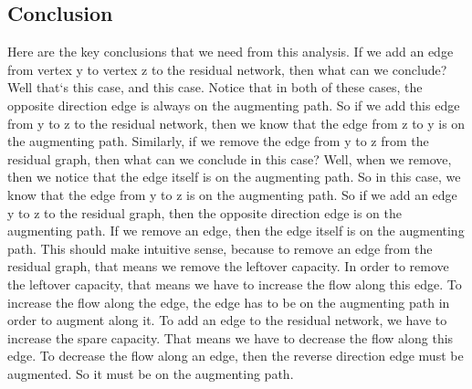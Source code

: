 \subsection{Conclusion}
Here are the key conclusions that we need from this analysis.
If we add an edge from vertex y to vertex z to the residual network, then what can we conclude? Well that`s this case, and this case.
Notice that in both of these cases, the opposite direction edge is always on the augmenting path.
So if we add this edge from y to z to the residual network, then we know that the edge from z to y is on the augmenting path.
Similarly, if we remove the edge from y to z from the residual graph, then what can we conclude in this case? Well, when we remove, then we notice that the edge itself is on the augmenting path.
So in this case, we know that the edge from y to z is on the augmenting path.
So if we add an edge y to z to the residual graph, then the opposite direction edge is on the augmenting path.
If we remove an edge, then the edge itself is on the augmenting path.
This should make intuitive sense, because to remove an edge from the residual graph, that means we remove the leftover capacity.
In order to remove the leftover capacity, that means we have to increase the flow along this edge.
To increase the flow along the edge, the edge has to be on the augmenting path in order to augment along it.
To add an edge to the residual network, we have to increase the spare capacity.
That means we have to decrease the flow along this edge.
To decrease the flow along an edge, then the reverse direction edge must be augmented.
So it must be on the augmenting path.

